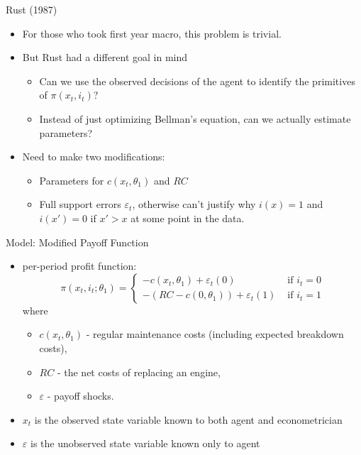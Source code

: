 \documentclass[aspectratio=169,11pt]{beamer}
\begin{document}
\begin{frame}{Rust (1987)}
\begin{itemize}
\item For those who took first year macro, this problem is trivial. 
\item But Rust had a different goal in mind
\begin{itemize}
\item Can we use the observed decisions of the agent to identify the primitives of $\pi(x_t,i_t)$?
\item Instead of just optimizing Bellman's equation, can we actually \alert{estimate parameters}?
\end{itemize}
\item Need to make two modifications: 
\begin{itemize}
\item Parameters for $c(x_t,\theta_1)$ and $RC$
\item Full support errors $\varepsilon_{t}$, otherwise can't justify why $i(x)=1$ and $i(x')=0$ if $x'>x$ at some point in the data.
\end{itemize}
\end{itemize}
\end{frame}

\begin{frame}{Model: Modified Payoff Function}
\begin{itemize}
	\item per-period profit function:\[
		\pi \left(x_{t},i_{t}; \theta_{1}\right)=
		\begin{cases}
		-c\left(x_{t},\theta_{1}\right)+\varepsilon_{t}\left(0\right) & \mbox{ if }i_{t}=0\\		
		-\left(RC-c\left(0,\theta_{1}\right)\right)+\varepsilon_{t}\left(1\right) & \mbox{ if }i_{t}=1
		\end{cases}
		\]
	where \\
	\begin{itemize}
		\item $c\left(x_{t},\theta_{1}\right) $ -  regular maintenance costs (including expected breakdown costs),
		\item $RC$ - the net costs of replacing an engine,
		\item $\varepsilon$ - payoff shocks.
	\end{itemize}
	
	\item $x_{t}$ is the \alert{observed state variable} known to both agent and econometrician
	\item $\varepsilon$ is the \alert{unobserved state variable} known only to agent
\end{itemize}
\end{frame}
\end{document}
